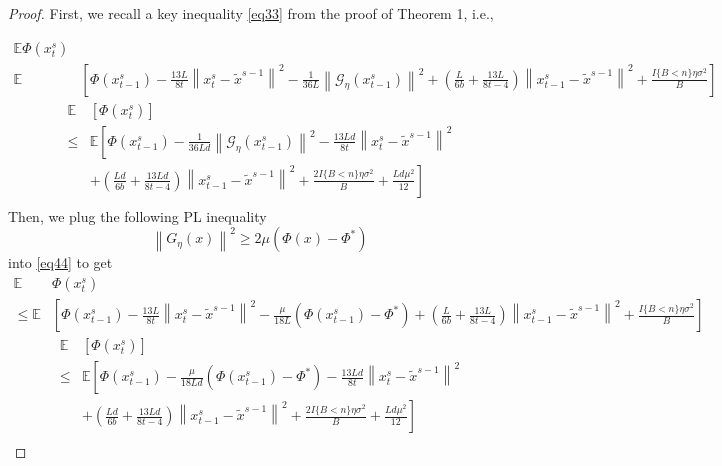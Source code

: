 \documentclass{article}
\newcommand*{\G}{\mathcal{G}}
\newcommand*{\E}{\mathbb{E}}
\newcommand{\norm}[1]{\left\lVert#1\right\rVert}
\theoremstyle{definition}
\theoremstyle{remark}
\begin{document}
\begin{proof}
First, we recall a key inequality \eqref{eq33} from the proof of Theorem 1, i.e.,

\begin{equation}\label{eq44}
\begin{split}
\E\Phi({x}_{t}^s)&\\
\E&\left[\Phi({x}_{t-1}^s)  -\frac{13L}{8t}\norm{{x}_t^s-\tilde{x}^{s-1}}^2- \frac{1}{36 L}\norm{\G_{\eta}(x_{t-1}^s)}^2+(\frac{L}{6b}+\frac{13L}{8t-4}) \norm{x_{t-1}^s-\tilde{x}^{s-1}}^2 + \frac{I\{B < n\}\eta \sigma ^2}{B}\right]
\end{split}
\end{equation}
{\color{blue}
\begin{equation}\label{eq44}
\begin{split}
\E&[\Phi({x}_{t}^s)]
\\  
\leq& \E\left[\Phi({x}_{t-1}^s) - \frac{1}{36 Ld}\norm{\G_{\eta}(x_{t-1}^s)}^2 -\frac{13L d}{8t}\norm{{x}_t^s-\tilde{x}^{s-1}}^2\right.\\
&\left.+(\frac{L d}{6b}+\frac{13Ld}{8t-4}) \norm{x_{t-1}^s-\tilde{x}^{s-1}}^2 + \frac{2I\{B < n\}\eta \sigma ^2}{B}+ \frac{L d \mu^2}{12}\right]\\
\end{split}
\end{equation}
}
Then, we plug the following PL inequality 
\begin{equation}
\norm{G_{\eta}(x)}^2 \geq 2\mu (\Phi(x) - \Phi^*)
\end{equation}
into \eqref{eq44} to get
\begin{equation}\label{eq45}
\begin{split}
\E&\Phi({x}_{t}^s)\\
\leq\E&\left[\Phi({x}_{t-1}^s)  -\frac{13L}{8t}\norm{{x}_t^s-\tilde{x}^{s-1}}^2- \frac{\mu}{18 L}(\Phi({x}_{t-1}^s) - \Phi^*)+(\frac{L}{6b}+\frac{13L}{8t-4}) \norm{x_{t-1}^s-\tilde{x}^{s-1}}^2 + \frac{I\{B < n\}\eta \sigma ^2}{B}\right]
\end{split}
\end{equation}
{\color{blue}
\begin{equation}\label{eq45}
\begin{split}
\E&[\Phi({x}_{t}^s)]
\\  
\leq& \E\left[\Phi({x}_{t-1}^s) - \frac{\mu}{18 L d}(\Phi({x}_{t-1}^s) - \Phi^*) -\frac{13L d}{8t}\norm{{x}_t^s-\tilde{x}^{s-1}}^2\right.\\
&\left.+(\frac{L d}{6b}+\frac{13Ld}{8t-4}) \norm{x_{t-1}^s-\tilde{x}^{s-1}}^2 + \frac{2I\{B < n\}\eta \sigma ^2}{B}+ \frac{L d \mu^2}{12}\right]\\

\end{split}
\end{equation}}
\end{proof}
\end{document}
